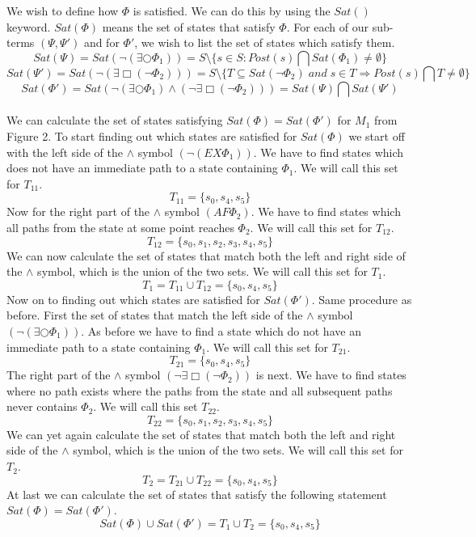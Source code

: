 \documentclass[12pt]{report}
\begin{document}
We wish to define how $\Phi$ is satisfied. We can do this by using the $Sat()$ keyword. $Sat(\Phi)$ means the set of states that satisfy $\Phi$. For each of our sub-terms $(\Psi, \Psi')$ and for $\Phi'$, we wish to list the set of states which satisfy them.
$$Sat(\Psi) = Sat\left(\neg(\exists \bigcirc \Phi_1)\right) = S \setminus \{s \in S : Post(s) \bigcap Sat(\Phi_1) \neq \emptyset\}$$
$$Sat(\Psi') = Sat\left(\neg(\exists \Box (\neg \Phi_2))\right) = S \setminus \{T \subseteq Sat(\neg \Phi_2) \; and \; s \in T \Rightarrow Post(s) \bigcap T \neq \emptyset\}$$
$$Sat(\Phi') = Sat\left(\neg(\exists \bigcirc \Phi_1) \wedge (\neg\exists \Box (\neg \Phi_2))\right) = Sat(\Psi) \bigcap Sat(\Psi')$$
\\
We can calculate the set of states satisfying $Sat(\Phi) = Sat(\Phi')$ for $M_1$ from Figure 2. To start finding out which states are satisfied for $Sat(\Phi)$ we start off with the left side of the $\wedge$ symbol $(\neg(EX \Phi_1))$. We have to find states which does not have an immediate path to a state containing $\Phi_1$. We will call this set for $T_{11}$.
$$T_{11} = \{s_0,s_4,s_5\}$$
Now for the right part of the $\wedge$ symbol $(AF \Phi_2)$. We have to find states which all paths from the state at some point reaches $\Phi_2$. We will call this set for $T_{12}$.
$$T_{12} = \{s_0,s_1,s_2,s_3,s_4,s_5\}$$
We can now calculate the set of states that match both the left and right side of the $\wedge$ symbol, which is the union of the two sets. We will call this set for $T_1$.
$$T_1 = T_{11} \cup T_{12} = \{s_0,s_4,s_5\}$$
Now on to finding out which states are satisfied for $Sat(\Phi')$. Same procedure as before. First the set of states that match the left side of the $\wedge$ symbol $(\neg(\exists \bigcirc \Phi_1))$. As before we have to find a state which do not have an immediate path to a state containing $\Phi_1$. We will call this set for $T_{21}$.
$$T_{21} = \{s_0,s_4,s_5\}$$
The right part of the $\wedge$ symbol $(\neg\exists \Box (\neg \Phi_2))$ is next. We have to find states where no path exists where the paths from the state and all subsequent paths never contains $\Phi_2$. We will call this set $T_{22}$.
$$T_{22} = \{s_0,s_1,s_2,s_3,s_4,s_5\}$$
We can yet again calculate the set of states that match both the left and right side of the $\wedge$ symbol, which is the union of the two sets. We will call this set for $T_2$.
$$T_2 = T_{21} \cup T_{22} = \{s_0,s_4,s_5\}$$
At last we can calculate the set of states that satisfy the following statement $Sat(\Phi) = Sat(\Phi')$.
$$Sat(\Phi) \cup Sat(\Phi') = T_1 \cup T_2 = \{s_0,s_4,s_5\}$$
\end{document}
